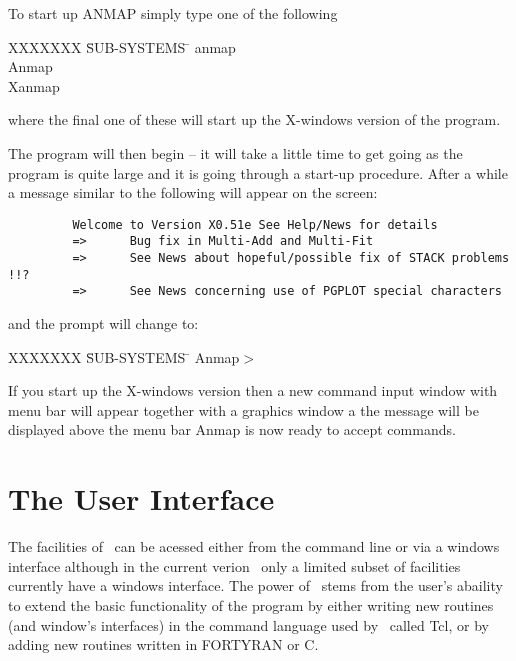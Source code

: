 To start up ANMAP simply type one of the following
\begin{tabbing}
XXXXXXX \= SUB-SYSTEMS \= \kill
\> anmap \\
\> Anmap \\
\> Xanmap \\
\end{tabbing}
where the final one of these will start up the X-windows version of
the program.

The program will then begin -- it will take a little time to
get going as the program is quite large and it is going
through a start-up procedure. After a while a message similar
to the following will appear on the screen:
\begin{verbatim}
         Welcome to Version X0.51e See Help/News for details
         =>      Bug fix in Multi-Add and Multi-Fit
         =>      See News about hopeful/possible fix of STACK problems !!?
         =>      See News concerning use of PGPLOT special characters
\end{verbatim}
and the prompt will change to:
\begin{tabbing}
XXXXXXX \= SUB-SYSTEMS \= \kill
\>  Anmap$>$ \\
\end{tabbing}
If you start up the X-windows version then a new command input
window with menu bar will appear together with a graphics window a
the message will be displayed above the menu bar
Anmap is now ready to accept commands. 

\section{The User Interface}

The facilities of \Anmap\ can be acessed either from the
command line or via a windows interface although in the
current verion \Version\ only a limited subset of facilities
currently have a windows interface.  The power of \Anmap\ stems
from the user's abaility to extend the basic functionality of
the program by either writing new routines (and window's interfaces)
in the command language used by \Anmap\ called Tcl, or by adding
new routines written in FORTYRAN or C.

